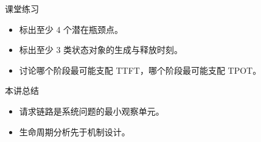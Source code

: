 \begin{frame}{课堂练习}
  \begin{itemize}
    \item 标出至少 4 个潜在瓶颈点。
    \item 标出至少 3 类状态对象的生成与释放时刻。
    \item 讨论哪个阶段最可能支配 TTFT，哪个阶段最可能支配 TPOT。
  \end{itemize}
\end{frame}



\begin{frame}{本讲总结}
  \begin{itemize}
    \item 请求链路是系统问题的最小观察单元。
    \item 生命周期分析先于机制设计。
  \end{itemize}
\end{frame}

